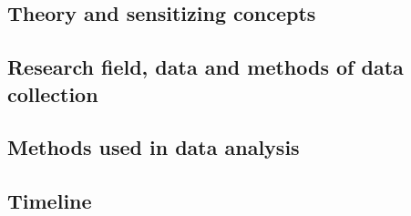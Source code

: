 \documentclass[12pt, a4paper, abstract=off, oneside]{scrartcl}
\begin{document}
        \subsection{Theory and sensitizing concepts} %
        \label{sub:theory_and_sensitizing_concepts}


        

        \subsection{Research field, data and methods of data collection} %
        \label{sub:research_field_data_and_methods_of_data_collection}


        

        \subsection{Methods used in data analysis} %
        \label{sub:methods_used_in_data_analysis}

        

        \subsection{Timeline} %
        \label{sub:timeline}


        


	
	
\end{document}
